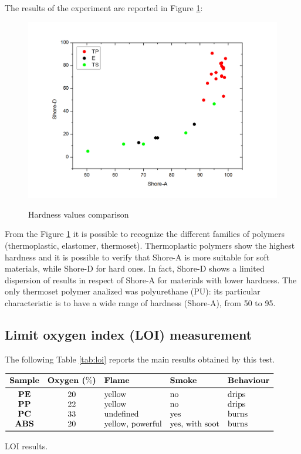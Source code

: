 \documentclass[a4paper, 11pt]{article}
\begin{document}
The results of the experiment are reported in Figure \ref{fig:duro}:

\begin{figure}[htp]
	\centering
	{\includegraphics[scale=0.3]{duro}}
	\captionsetup{justification=centering}
	\caption{Hardness values comparison}
	\label{fig:duro}
\end{figure}

From the Figure \ref{fig:duro} it is possible to recognize the different families of polymers (thermoplastic, elastomer, thermoset). Thermoplastic polymers show the highest hardness and it is possible to verify that Shore-A is more suitable for soft materials, while Shore-D for hard ones. In fact, Shore-D shows a limited dispersion of results in respect of Shore-A for materials with lower hardness. The only thermoset polymer analized was polyurethane (PU): its particular characteristic is to have a wide range of hardness (Shore-A), from 50 to 95.

\subsection{Limit oxygen index (LOI) measurement} 

The following Table \ref{tab:loi} reports the main results obtained by this test.
\begin{table}[htp]
	\centering
	$
	\begin{array}{cclll}
	\toprule
	\textbf{Sample} & \textbf{Oxygen ($\%$)} & \textbf{Flame} & \textbf{Smoke} & \textbf{Behaviour} \\
	\midrule
	\textbf{PE} & 20 & \text{yellow} & \text{no} & \text{drips}\\
	\textbf{PP} & 22 & \text{yellow} & \text{no} & \text{drips}\\
	\textbf{PC} & 33 & \text{undefined} & \text{yes} & \text{burns}\\
	\textbf{ABS} & 20 & \text{yellow, powerful} & \text{yes, with soot} & \text{burns}\\
	\bottomrule
	\end{array}
	$
	\caption{LOI results.}
	\label{tab:loi}
\end{table}
\end{document}
